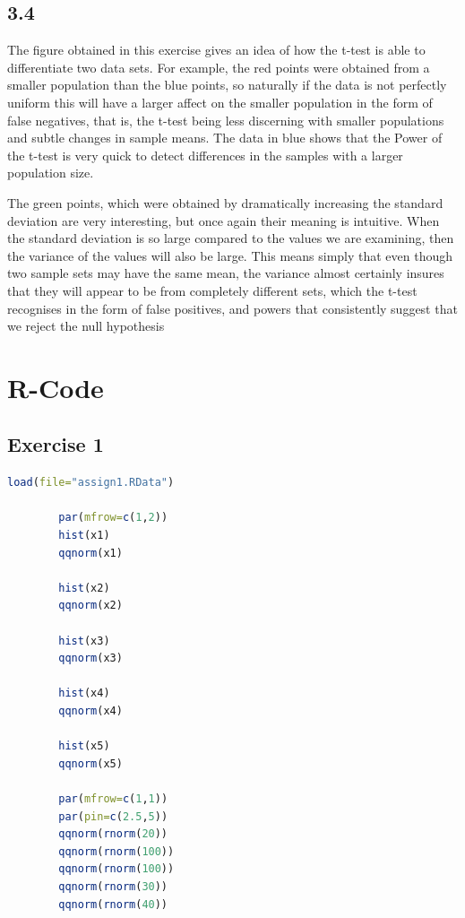 \documentclass{article}
\begin{document}
    \subsection{3.4}
      The figure obtained in this exercise gives an idea of how the t-test is able to differentiate two data sets. For example, the red points were obtained from a smaller population than the blue points, so naturally if the data is not perfectly uniform this will have a larger affect on the smaller population in the form of false negatives, that is, the t-test being less discerning with smaller populations and subtle changes in sample means. The data in blue shows that the Power of the t-test is very quick to detect differences in the samples with a larger population size.
      
      The green points, which were obtained by dramatically increasing the standard deviation are very interesting, but once again their meaning is intuitive. When the standard deviation is so large compared to the values we are examining, then the variance of the values will also be large. This means simply that even though two sample sets may have the same mean, the variance almost certainly insures that they will appear to be from completely different sets, which the t-test recognises in the form of false positives, and powers that consistently suggest that we reject the null hypothesis
\newpage
  \section{R-Code}
    \subsection{Exercise 1}\label{sub:R1}
      \begin{lstlisting}[language=R]
        load(file="assign1.RData")

        par(mfrow=c(1,2))
        hist(x1)
        qqnorm(x1)

        hist(x2)
        qqnorm(x2)

        hist(x3)
        qqnorm(x3)

        hist(x4)
        qqnorm(x4)

        hist(x5)
        qqnorm(x5)

        par(mfrow=c(1,1))
        par(pin=c(2.5,5))
        qqnorm(rnorm(20))
        qqnorm(rnorm(100))
        qqnorm(rnorm(100))
        qqnorm(rnorm(30))
        qqnorm(rnorm(40))
      \end{lstlisting}
\end{document}
